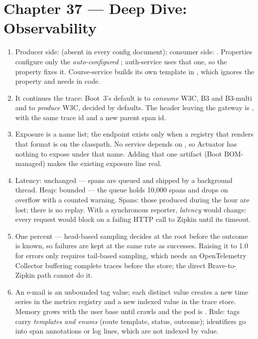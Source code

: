 \section*{Chapter 37 --- Deep Dive: Observability}
\begin{enumerate}
  \item Producer side:
  (absent in every config document); consumer side:
  .
  Properties
  configure only the \emph{auto-configured} ;
  auth-service uses that one, so the property fixes it.
  Course-service builds its own template in ,
  which ignores the property and needs
   in code.
  \item It continues the trace: Boot~3's default is to \emph{consume}
  W3C, B3 and B3-multi and to \emph{produce} W3C, decided by
   defaults. The header leaving
  the gateway is , with the same trace id and a new
  parent span id.
  \item Exposure is a name list; the endpoint exists only when a
  registry that renders that format is on the classpath. No service
  depends on , so Actuator has
  nothing to expose under that name. Adding that one artifact (Boot
  BOM-managed) makes the existing exposure line real.
  \item Latency: unchanged --- spans are queued and shipped by a
  background thread. Heap: bounded --- the queue holds 10{,}000 spans
  and drops on overflow with a counted warning. Spans: those produced
  during the hour are lost; there is no replay. With a synchronous
  reporter, \emph{latency} would change: every request would block on
  a failing HTTP call to Zipkin until its timeout.
  \item One percent --- head-based sampling decides at the root before
  the outcome is known, so failures are kept at the same rate as
  successes. Raising it to 1.0 for errors only requires tail-based
  sampling, which needs an OpenTelemetry Collector buffering complete
  traces before the store; the direct Brave-to-Zipkin path cannot do
  it.
  \item An e-mail is an unbounded tag value; each distinct value
  creates a new time series in the metrics registry and a new indexed
  value in the trace store. Memory grows with the user base until
   crawls and the pod is . Rule:
  tags carry \emph{templates and enums} (route template, status,
  outcome); identifiers go into span annotations or log lines, which
  are not indexed by value.
\end{enumerate}

